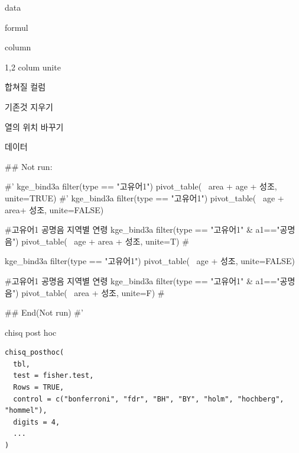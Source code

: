 \documentclass[a4paper]{book}
\begin{document}
\begin{Arguments}
\begin{ldescription}
\item[\code{data}] data

\item[\code{formula}] formul

\item[\code{names\_from}] column

\item[\code{unite}] 1,2 colum unite

\item[\code{col}] 합쳐질 컬럼

\item[\code{remove}] 기존것 지우기

\item[\code{change\_col}] 열의 위치 바꾸기
\end{ldescription}
\end{Arguments}
%
\begin{Value}
데이터
\end{Value}
%
\begin{Examples}
\begin{ExampleCode}

\#\# Not run: 

#' kge_bind3a %
filter(type == "고유어1")%
  pivot_table(~ area + age + 성조, unite=TRUE)
#'
kge_bind3a %
  filter(type == "고유어1")%
  pivot_table(~  age + area+ 성조, unite=FALSE)

#고유어1 공명음  지역별 연령
kge_bind3a %
  filter(type == "고유어1" & a1=="공명음")%
  pivot_table(~ age + area + 성조, unite=T)  #%



kge_bind3a %
  filter(type == "고유어1")%
  pivot_table(~  age +  성조, unite=FALSE)

#고유어1 공명음  지역별 연령
kge_bind3a %
  filter(type == "고유어1" & a1=="공명음")%
  pivot_table(~  area + 성조, unite=F)  #%


  
## End(Not run)
#'

\end{ExampleCode}
\end{Examples}
%
\begin{Description}
chisq post hoc
\end{Description}
%
\begin{Usage}
\begin{verbatim}
chisq_posthoc(
  tbl,
  test = fisher.test,
  Rows = TRUE,
  control = c("bonferroni", "fdr", "BH", "BY", "holm", "hochberg", "hommel"),
  digits = 4,
  ...
)
\end{verbatim}
\end{Usage}
\end{document}
